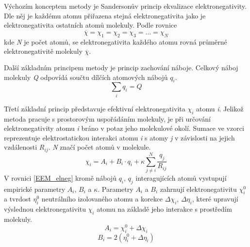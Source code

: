 
Výchozím konceptem metody je Sandersonův princip ekvalizace elektronegativity. Dle něj je každému atomu přiřazena stejná elektronegativita jako je elektronegativita ostatních atomů molekuly. Podle rovnice 
\begin{equation}
\label{Sanders}
    \overline{\chi} = \chi_1 = \chi_2 = \chi_3 = ... = \chi_N
\end{equation}
kde \textit{N} je počet atomů, se elektronegativita každého atomu rovná průměrné elektronegativitě molekuly $\overline{\chi}$. 

Další základním principem metody je princip zachování náboje. Celkový náboj molekuly \textit{Q} odpovídá součtu dílčích atomových nábojů $q_i$.
\begin{equation}
\label{EEM_chargesum}
    \sum_{i} q_i = Q
\end{equation}

Třetí základní princip představuje efektivní elektronegativita $\chi_i$ atomu \textit{i}. Jelikož metoda pracuje s prostorovým uspořádáním molekuly, je při určování elektronegativity atomu \textit{i} bráno v potaz jeho molekulové okolí. Sumace ve vzorci reprezentuje elektrostatickou interakci atomu \textit{i} s atomy \textit{j} v závislosti na jejich vzdálenosti $R_{ij}$. \textit{N} značí počet atomů v molekule.
\begin{equation}
\label{EEM_elneg}
    \chi_i = A_i + B_i\cdot q_i + \kappa \sum_{j \neq i}^{N} \frac{q_j}{R_{ij}}
\end{equation}
V rovnici \ref{EEM_elneg} kromě nábojů $q_i$, $q_j$ interagujících atomů vystupují empirické parametry $A_i$, $B_i$ a $\kappa$. Parametry  $A_i$ a $B_i$ zahrnují elektronegativitu $\chi_{i}^{0}$ a tvrdost $\eta_{i}^{0}$ neutrálního izolovaného atomu a korekce $\Delta \chi_i$, $\Delta \eta_i$, které upravují výslednou elektronegativitu $\chi_i$ atomu na základě jeho interakce s prostředím molekuly. 
\begin{equation}
    A_i = \chi_{i}^{0} + \Delta \chi_i
\end{equation}
\begin{equation}
        B_i = 2(\eta_{i}^{0} + \Delta \eta_i)
\end{equation}

